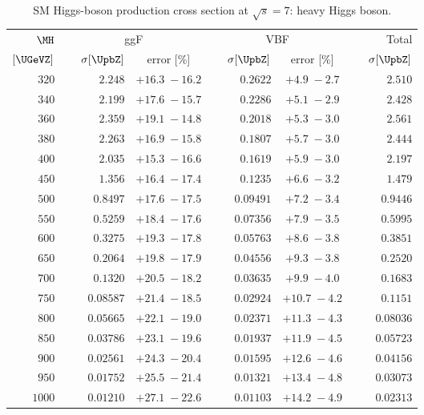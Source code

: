 
\begin{landscape}
\begin{table}
  \begin{center}
	\caption{SM Higgs-boson production cross section at 
	$\sqrt{s}=7$\UTeV: heavy Higgs boson.}    
    \small
	\begin{tabular}{r|rc|rc|r}
\hline
$\MH$ & \multicolumn{2}{c|}{ggF} & \multicolumn{2}{c|}{VBF} &  Total \\
$[\UGeVZ]$ & $~~~~\sigma [\UpbZ]$  & error [\%]
	       & $~~~~\sigma [\UpbZ]$  & error [\%]
	       & $~~~~\sigma [\UpbZ]$ \\
\hline
 $ 320$ & $  2.248$ & $ +16.3 \; -\!16.2$ & $ 0.2622$ & $ +4.9  \; -\!2.7$ &  $     2.510$ \\ 
 $ 340$ & $  2.199$ & $ +17.6 \; -\!15.7$ & $ 0.2286$ & $ +5.1  \; -\!2.9$ &  $     2.428$ \\ 
 $ 360$ & $  2.359$ & $ +19.1 \; -\!14.8$ & $ 0.2018$ & $ +5.3  \; -\!3.0$ &  $     2.561$ \\ 
 $ 380$ & $  2.263$ & $ +16.9 \; -\!15.8$ & $ 0.1807$ & $ +5.7  \; -\!3.0$ &  $     2.444$ \\ 
 $ 400$ & $  2.035$ & $ +15.3 \; -\!16.6$ & $ 0.1619$ & $ +5.9  \; -\!3.0$ &  $     2.197$ \\ 
 $ 450$ & $  1.356$ & $ +16.4 \; -\!17.4$ & $ 0.1235$ & $ +6.6  \; -\!3.2$ &  $     1.479$ \\ 
 $ 500$ & $ 0.8497$ & $ +17.6 \; -\!17.5$ & $0.09491$ & $ +7.2  \; -\!3.4$ &  $    0.9446$ \\ 
 $ 550$ & $ 0.5259$ & $ +18.4 \; -\!17.6$ & $0.07356$ & $ +7.9  \; -\!3.5$ &  $    0.5995$ \\ 
 $ 600$ & $ 0.3275$ & $ +19.3 \; -\!17.8$ & $0.05763$ & $ +8.6  \; -\!3.8$ &  $    0.3851$ \\ 
 $ 650$ & $ 0.2064$ & $ +19.8 \; -\!17.9$ & $0.04556$ & $ +9.3  \; -\!3.8$ &  $    0.2520$ \\ 
 $ 700$ & $ 0.1320$ & $ +20.5 \; -\!18.2$ & $0.03635$ & $ +9.9  \; -\!4.0$ &  $    0.1683$ \\ 
 $ 750$ & $0.08587$ & $ +21.4 \; -\!18.5$ & $0.02924$ & $ +10.7 \; -\!4.2$ &  $    0.1151$ \\ 
 $ 800$ & $0.05665$ & $ +22.1 \; -\!19.0$ & $0.02371$ & $ +11.3 \; -\!4.3$ &  $   0.08036$ \\ 
 $ 850$ & $0.03786$ & $ +23.1 \; -\!19.6$ & $0.01937$ & $ +11.9 \; -\!4.5$ &  $   0.05723$ \\ 
 $ 900$ & $0.02561$ & $ +24.3 \; -\!20.4$ & $0.01595$ & $ +12.6 \; -\!4.6$ &  $   0.04156$ \\ 
 $ 950$ & $0.01752$ & $ +25.5 \; -\!21.4$ & $0.01321$ & $ +13.4 \; -\!4.8$ &  $   0.03073$ \\ 
 $1000$ & $0.01210$ & $ +27.1 \; -\!22.6$ & $0.01103$ & $ +14.2 \; -\!4.9$ &  $   0.02313$ \\ 
\hline
	\end{tabular}
	\label{tab:XS7b}
	\end{center}
\end{table}
\end{landscape}


